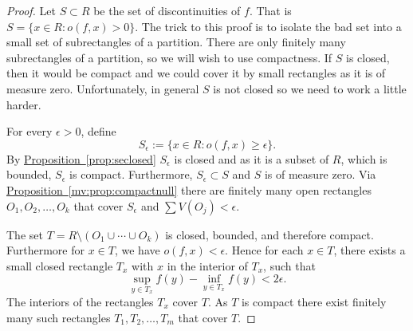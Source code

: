 \documentclass[12pt]{book}
\theoremstyle{plain}
\theoremstyle{remark}
\theoremstyle{definition}
\theoremstyle{exercise}
\theoremstyle{example}
\newcommand{\propref}[1]{\hyperref[#1]{Proposition~\ref*{#1}}}
\begin{document}
\begin{proof}
Let $S \subset R$ be the set of discontinuities of $f$.  That is
$S = \{ x \in R : o(f,x) > 0 \}$.  The trick to this proof is to isolate the
bad set into a small set of subrectangles of a partition.  There are only
finitely many subrectangles of a partition, so we will wish to use
compactness.  If $S$ is closed, then it would be compact and we could cover
it by small rectangles as it is of measure zero.  Unfortunately, in general $S$
is not closed so we need to work a little harder.

For every $\epsilon > 0$, define
\begin{equation*}
S_\epsilon := \{ x \in R : o(f,x) \geq \epsilon \} .
\end{equation*}
By \propref{prop:seclosed} $S_\epsilon$ is closed and as it is a subset of
$R$,
which is bounded, $S_\epsilon$ is compact.  Furthermore,
$S_\epsilon \subset S$ and $S$ is of measure zero.
Via \propref{mv:prop:compactnull} there are finitely many open rectangles
$O_1,O_2,\ldots,O_k$ that cover $S_\epsilon$ and
$\sum V(O_j) < \epsilon$.  

The set $T = R \setminus ( O_1 \cup \cdots \cup O_k )$ is closed, bounded,
and therefore compact.  Furthermore for $x \in T$, we have $o(f,x) <
\epsilon$.  Hence for each $x \in T$, there exists a small closed rectangle
$T_x$ with $x$ in the interior of $T_x$, such that
\begin{equation*}
\sup_{y\in T_x} f(y) - \inf_{y\in T_x} f(y) < 2\epsilon.
\end{equation*}
The interiors of the rectangles $T_x$ cover $T$.  As $T$ is compact
there exist finitely many such rectangles $T_1, T_2, \ldots, T_m$
that cover $T$.


\end{proof}
\end{document}
